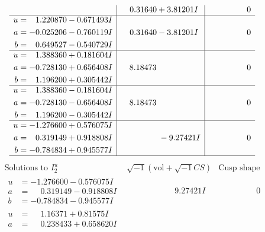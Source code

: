 \documentclass[1p]{elsarticle_modified}
\theoremstyle{definition}
\newcommand{\I}{\sqrt{-1}}
\begin{document}
$$\begin{array}{c|c|c}
 & \phantom{-}0.31640 + 3.81201 I & \phantom{-0.000000 } 0 \\ \hline\begin{aligned}
u &= \phantom{-}1.220870 - 0.671493 I \\
a &= -0.025206 - 0.760119 I \\
b &= \phantom{-}0.649527 - 0.540729 I\end{aligned}
 & \phantom{-}0.31640 - 3.81201 I & \phantom{-0.000000 } 0 \\ \hline\begin{aligned}
u &= \phantom{-}1.388360 + 0.181604 I \\
a &= -0.728130 + 0.656408 I \\
b &= \phantom{-}1.196200 + 0.305442 I\end{aligned}
 & \phantom{-}8.18473\phantom{ +0.000000I} & \phantom{-0.000000 } 0 \\ \hline\begin{aligned}
u &= \phantom{-}1.388360 - 0.181604 I \\
a &= -0.728130 - 0.656408 I \\
b &= \phantom{-}1.196200 - 0.305442 I\end{aligned}
 & \phantom{-}8.18473\phantom{ +0.000000I} & \phantom{-0.000000 } 0 \\ \hline\begin{aligned}
u &= -1.276600 + 0.576075 I \\
a &= \phantom{-}0.319149 + 0.918808 I \\
b &= -0.784834 + 0.945577 I\end{aligned}
 & \phantom{-0.000000 } -9.27421 I & \phantom{-0.000000 } 0\\
 \hline 
 \end{array}$$\newpage$$\begin{array}{c|c|c}  
\text{Solutions to }I^u_{2}& \I (\text{vol} + \sqrt{-1}CS) & \text{Cusp shape}\\
 \hline 
\begin{aligned}
u &= -1.276600 - 0.576075 I \\
a &= \phantom{-}0.319149 - 0.918808 I \\
b &= -0.784834 - 0.945577 I\end{aligned}
 & \phantom{-0.000000 -}9.27421 I & \phantom{-0.000000 } 0 \\ \hline\begin{aligned}
u &= \phantom{-}1.16371 + 0.81575 I \\
a &= \phantom{-}0.238433 + 0.658620 I \\

\end{aligned}
\end{array}$$
\end{document}
